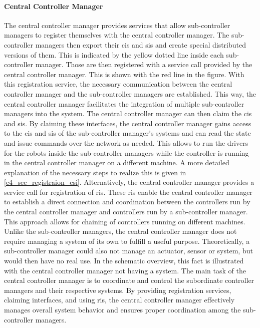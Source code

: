 \paragraph{Central Controller Manager}
The central controller manager provides services that allow sub-controller managers to register themselves with the central controller manager. The sub-controller managers then export their \glspl{ci} and \glspl{si} and create special distributed versions of them. This is indicated by the yellow dotted line inside each sub-controller manager. Those are then registered with a service call provided by the central controller manager. This is shown with the red line in the figure. With this registration service, the necessary communication between the central controller manager and the sub-controller managers are established. This way, the central controller manager facilitates the integration of multiple sub-controller managers into the system.\newline
The central controller manager can then claim the \glspl{ci} and \glspl{si}. By claiming these interfaces, the central controller manager gains access to the \glspl{ci} and \glspl{si} of the sub-controller manager's systems and can read the state and issue commands over the network as needed. This allows to run the drivers for the robots inside the sub-controller managers while the controller is running in the central controller manager on a different machine. A more detailed explanation of the necessary steps to realize this is given in \autoref{c4_sec_registraion_csi}.\newline
Alternatively, the central controller manager provides a service call for registration of \glspl{ri}. These \glspl{ri} enable the central controller manager to establish a direct connection and coordination between the controllers run by the central controller manager and controllers run by a sub-controller manager. This approach allows for chaining of controllers running on different machines.\newline
Unlike the sub-controller managers, the central controller manager does not require managing a system of its own to fulfill a useful purpose. Theoretically, a sub-controller manager could also not manage an actuator, sensor or system, but would then have no real use. In the schematic overview, this fact is illustrated with the central controller manager not having a system. The main task of the central controller manager is to coordinate and control the subordinate controller managers and their respective systems. By providing registration services, claiming interfaces, and using \glspl{ri}, the central controller manager effectively manages overall system behavior and ensures proper coordination among the sub-controller managers.
